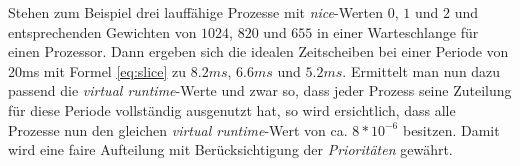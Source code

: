 Stehen zum Beispiel drei lauffähige Prozesse  mit \textit{nice}-Werten $0$, $1$ und $2$ und entsprechenden Gewichten von $1024$, $820$ und $655$ in einer Warteschlange für einen Prozessor.
Dann ergeben sich die idealen Zeitscheiben bei einer Periode von 20ms mit Formel \ref{eq:slice} zu $8.2ms$, $6.6ms$ und $5.2ms$. Ermittelt man nun dazu passend die \textit{virtual runtime}-Werte und zwar so, dass jeder Prozess seine Zuteilung für diese Periode vollständig ausgenutzt hat, so wird ersichtlich, dass alle Prozesse nun den gleichen \textit{virtual runtime}-Wert von ca. $8*10^{-6}$ besitzen. Damit wird eine faire Aufteilung mit Be\-rück\-sichtigung der \textit{Prioritäten} gewährt.






